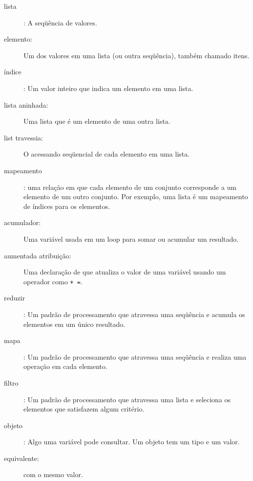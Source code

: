 \documentclass[10pt]{book}
\begin{document}
\begin{exercise}
\begin{description}
\item[lista]: A seqüência de valores.

\item[elemento:] Um dos valores em uma lista (ou outra seqüência),
também chamado itens.

\item[índice]: Um valor inteiro que indica um elemento em uma lista.

\item[lista aninhada:] Uma lista que é um elemento de uma outra lista.

\item[list travessia:] O acessando seqüencial de cada elemento em uma lista.

\item[mapeamento]: uma relação em que cada elemento de um conjunto
corresponde a um elemento de um outro conjunto. Por exemplo, uma lista é
um mapeamento de índices para os elementos.

\item[acumulador:] Uma variável usada em um loop para somar ou
acumular um resultado.

\item[aumentada atribuição:] Uma declaração de que atualiza o valor
de uma variável usando um operador como \verb "+ =".

\item[reduzir]: Um padrão de processamento que atravessa uma seqüência 
e acumula os elementos em um único resultado.

\item[mapa]: Um padrão de processamento que atravessa uma seqüência e
realiza uma operação em cada elemento.

\item[filtro]: Um padrão de processamento que atravessa uma lista e
seleciona os elementos que satisfazem algum critério.

\item[objeto]: Algo uma variável pode consultar. Um objeto
tem um tipo e um valor.

\item[equivalente:] com o mesmo valor.


\end{description}
\end{exercise}
\end{document}
